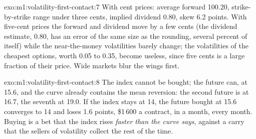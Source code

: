 \begin{solution}{exo:m1:volatility-first-contact:7}
With cent prices: average forward 100.20, strike-by-strike range under three
cents, implied dividend 0.80, skew 6.2 points. With five-cent prices the
forward and dividend move by a few cents (the dividend estimate, 0.80, has an
error of the same size as the rounding, several percent of itself) while the
near-the-money volatilities barely change; the volatilities of the cheapest
options, worth 0.05 to 0.35, become useless, since five cents is a large
fraction of their price. Wide markets blur the wings first.
\end{solution}

\begin{solution}{exo:m1:volatility-first-contact:8}
The index cannot be bought; the future can, at 15.6, and the curve already
contains the mean reversion: the second future is at 16.7, the seventh at
19.0. If the index stays at 14, the future bought at 15.6 converges to 14 and
loses 1.6 points, \$1\,600 a contract, in a month, every month. Buying is a
bet that the index rises \emph{faster than the curve says}, against a carry
that the sellers of volatility collect the rest of the time.
\end{solution}


